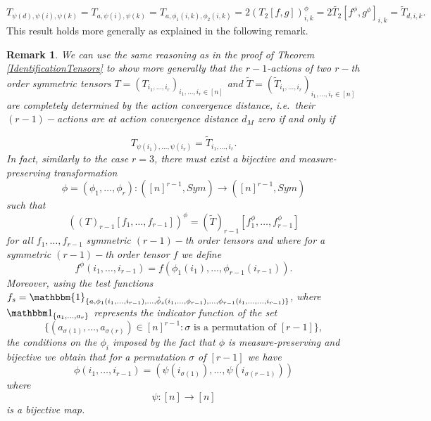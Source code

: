 \documentclass[11pt]{article}
\newtheorem{remark}[theorem]{Remark}
\begin{document}
$$T_{\psi(d),\psi(i),\psi(k)}=T_{a,\psi(i),\psi(k)}=T_{a,\phi_1(i,k),\phi_2(i,k)}=2(T_2[f,g])_{i,k}^{\phi}=2\widetilde{T_2}[f^{\phi},g^{\phi}]_{i,k}=\widetilde{T}_{d,i,k}.$$
\endproof
This result holds more generally as explained in the following remark.
\begin{remark}
We can use the same reasoning as in the proof of Theorem \ref{IdentificationTensors} to show more generally that the $r-1$-actions of two $r-$th order symmetric tensors $T=(T_{i_1,\ldots,i_r})_{i_1,\ldots,i_r\in [n]}$ and $\widetilde{T}=(\widetilde{T}_{i_1,\ldots,i_r})_{i_1,\ldots,i_r\in [n]}$ are completely determined by the action convergence distance, i.e.\ their $(r-1)-$actions are at action convergence distance $d_M$ zero %
if and only if  

$$
T_{\psi(i_1),\ldots,\psi(i_{r})}=\widetilde{T}_{i_1,\ldots,i_r}.
$$
In fact, similarly to the case $r=3$, 
there must exist a  bijective and measure-preserving transformation 
$$\phi=(\phi_1,\ldots,\phi_{r}):([n]^{r-1},Sym)\longrightarrow ([n]^{r-1},Sym)$$
such that $$
((T)_{r-1}[f_1,\ldots,f_{r-1}])^{\phi}=(\widetilde{T})_{r-1}[f^{\phi}_1,\ldots,f^{\phi}_{r-1}]
$$
for all $f_1,\ldots,f_{r-1}$ symmetric $(r-1)-$th order tensors and where for a symmetric $(r-1)-$th order tensor $f$ we define $$f^{\phi}(i_1,\ldots,i_{r-1})=f(\phi_1(i_1),\ldots,\phi_{r-1}(i_{r-1})).$$
Moreover, using the test functions $f_s=\mathbbm{1}_{\{a,\phi_1(i_1,\ldots,i_{r-1}),\ldots,\hat{\phi}_s(i_1,\ldots,\phi_{r-1}),\ldots, \phi_{r-1}(i_1,\ldots ,\ldots,i_{r-1})\}}$, where $\mathbbm1_{\{a_1,\ldots,a_r\}}$ represents the indicator function of the set $$\{(a_{\sigma(1)},\ldots,a_{\sigma(r)})\in [n]^{r-1}: \sigma \text{ is a permutation of } [r-1]\},$$ the conditions on the $\phi_i$ imposed by the fact that $\phi$ is measure-preserving and bijective we obtain that  for a permutation $\sigma$ of $[r-1]$ we have $$\phi(i_1,\ldots,i_{r-1})=%
(\psi(i_{\sigma(1)}),\ldots,\psi(i_{\sigma(r-1)}))$$
where $$\psi:[n]\rightarrow[n]$$
is a bijective map. 
\end{remark}
\end{document}
